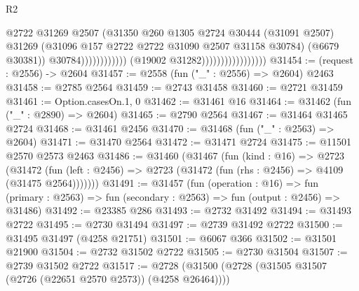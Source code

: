 \begin{lexlean}{R2}
\begin{coremodule}
                                                            @2722
                                                            @31269
                                                            @2507
                                                            (@31350
                                                              @260
                                                              @1305
                                                              @2724
                                                              @30444
                                                              (@31091 @2507)
                                                              @31269
                                                              (@31096
                                                                @157
                                                                @2722
                                                                @2722
                                                                @31090
                                                                @2507
                                                                @31158
                                                                @30784)
                                                              (@6679 @30381))
                                                            @30784))))))))))))
                                    (@19002 @31282)))))))))))))))))
@31454 := (request : @2556) -> @2604
@31457 := @2558 (fun ("_" : @2556) => @2604) @2463
@31458 := @2785 @2564
@31459 := @2743 @31458
@31460 := @2721 @31459
@31461 := Option.casesOn.{1, 0}
@31462 := @31461 @16
@31464 := @31462 (fun ("_" : @2890) => @2604)
@31465 := @2790 @2564
@31467 := @31464 @31465 @2724
@31468 := @31461 @2456
@31470 := @31468 (fun ("_" : @2563) => @2604)
@31471 := @31470 @2564
@31472 := @31471 @2724
@31475 := @11501 @2570 @2573 @2463
@31486 := @31460
    (@31467
      (fun (kind : @16) =>
      @2723
        (@31472
          (fun (left : @2456) => @2723 (@31472 (fun (rhs : @2456) => @4109 (@31475 @2564)))))))
@31491 := @31457
    (fun (operation : @16) =>
    fun (primary : @2563) => fun (secondary : @2563) => fun (output : @2456) => @31486)
@31492 := @23385 @286
@31493 := @2732 @31492
@31494 := @31493 @2722
@31495 := @2730 @31494
@31497 := @2739 @31492 @2722
@31500 := @31495 @31497 (@4258 @21751)
@31501 := @6067 @366
@31502 := @31501 @21900
@31504 := @2732 @31502 @2722
@31505 := @2730 @31504
@31507 := @2739 @31502 @2722
@31517 := @2728 (@31500 (@2728 (@31505 @31507 (@2726 (@22651 @2570 @2573)) (@4258 @26464))))

\end{coremodule}
\end{lexlean}
